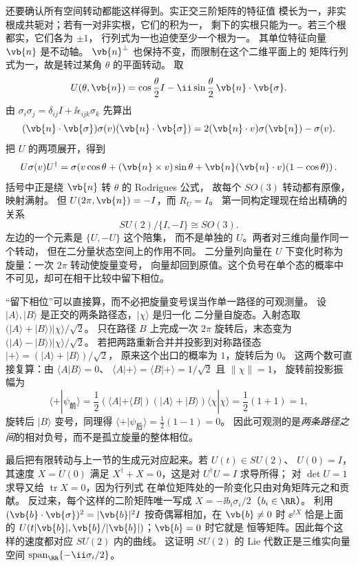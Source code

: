 还要确认所有空间转动都能这样得到。实正交三阶矩阵的特征值
模长为一，非实根成共轭对；若有一对非实根，它们的积为一，
剩下的实根只能为一。若三个根都实，它们各为 \(\pm1\)，
行列式为一也迫使至少一个根为一。
其单位特征向量 \(\vb{n}\) 是不动轴。
\(\vb{n}^\perp\) 也保持不变，而限制在这个二维平面上的
矩阵行列式为一，故是转过某角 \(\theta\) 的平面转动。
取
\[
U(\theta,\vb{n})
=\cos\frac{\theta}{2}I-\ii\sin\frac{\theta}{2}\,
\vb{n}\cdot\vb{\sigma} .
\]
由 \(\sigma_i\sigma_j=\delta_{ij}I+
\ii\epsilon_{ijk}\sigma_k\) 先算出
\[
(\vb{n}\cdot\vb{\sigma})\sigma(v)
(\vb{n}\cdot\vb{\sigma})
=2(\vb{n}\cdot v)\sigma(\vb{n})-\sigma(v).
\]
把 \(U\) 的两项展开，得到
\[
U\sigma(v)U^\dagger
=\sigma\!\left(v\cos\theta+
(\vb{n}\times v)\sin\theta+
\vb{n}(\vb{n}\cdot v)(1-\cos\theta)\right).
\]
括号中正是绕 \(\vb{n}\) 转 \(\theta\) 的 Rodrigues 公式，
故每个 \(SO(3)\) 转动都有原像，映射满射。
但 \(U(2\pi,\vb{n})=-I\)，而 \(R_U=I\)。
第一同构定理现在给出精确的关系
\[
SU(2)/\{I,-I\}\cong SO(3).
\]
左边的一个元素是 \(\{U,-U\}\) 这个陪集，
而不是单独的 \(U\)。两者对三维向量作同一个转动，
但在二分量状态空间上的作用不同。
二分量列向量在 \(U\) 下变化时称为旋量：一次 \(2\pi\) 转动使旋量变号，
向量却回到原值。这个负号在单个态的概率中不可见，却可在相干比较中留下相位。

“留下相位”可以直接算，而不必把旋量变号误当作单一路径的可观测量。
设 \(|A\rangle,|B\rangle\) 是正交的两条路径态，\(|\chi\rangle\) 是归一化
二分量自旋态。入射态取
\(\bigl(|A\rangle+|B\rangle\bigr)|\chi\rangle/\sqrt2\)。
只在路径 \(B\) 上完成一次 \(2\pi\) 旋转后，末态变为
\(\bigl(|A\rangle-|B\rangle\bigr)|\chi\rangle/\sqrt2\)。
若把两路重新合并并投影到对称路径态
\(|+\rangle=(|A\rangle+|B\rangle)/\sqrt2\)，
原来这个出口的概率为 \(1\)，旋转后为 \(0\)。
这两个数可直接复算：由 \(\langle A|B\rangle=0\)、
\(\langle A|+\rangle=\langle B|+\rangle=1/\sqrt2\) 且 \(\|\chi\|=1\)，
旋转前投影振幅为
\[
\langle +|\psi_{\text{前}}\rangle
=\frac12(\langle A|+\langle B|)(|A\rangle+|B\rangle)\langle\chi|\chi\rangle
=\frac12(1+1)=1,
\]
旋转后 \(|B\rangle\) 变号，同理得
\(\langle +|\psi_{\text{后}}\rangle=\frac12(1-1)=0\)。
因此可观测的是\emph{两条路径之间}的相对负号，而不是孤立旋量的整体相位。

最后把有限转动与上一节的生成元对应起来。若 \(U(t)\in SU(2)\)、
\(U(0)=I\)，其速度 \(X=\dot U(0)\) 满足
\(X^\dagger+X=0\)，这是对 \(U^\dagger U=I\) 求导所得；
对 \(\det U=1\) 求导又给 \(\operatorname{tr}X=0\)，因为行列式
在单位矩阵处的一阶变化只由对角矩阵元之和贡献。
反过来，每个这样的二阶矩阵唯一写成
\(X=-\ii b_i\sigma_i/2\)（\(b_i\in\RR\)）。
利用 \((\vb{b}\cdot\vb{\sigma})^2=|\vb{b}|^2I\)
按奇偶幂相加，在 \(\vb{b}\ne0\) 时 \(\ee^{tX}\) 恰是上面的
\(U(t|\vb{b}|,\vb{b}/|\vb{b}|)\)；\(\vb{b}=0\) 时它就是
恒等矩阵。因此每个这样的速度都对应 \(SU(2)\) 内的曲线。
这证明 \(SU(2)\) 的 Lie 代数正是三维实向量空间
\(\operatorname{span}_{\RR}\{-\ii\sigma_i/2\}\)。

